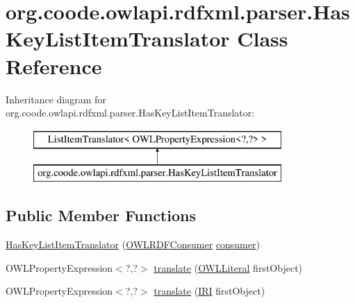\hypertarget{classorg_1_1coode_1_1owlapi_1_1rdfxml_1_1parser_1_1_has_key_list_item_translator}{\section{org.\-coode.\-owlapi.\-rdfxml.\-parser.\-Has\-Key\-List\-Item\-Translator Class Reference}
\label{classorg_1_1coode_1_1owlapi_1_1rdfxml_1_1parser_1_1_has_key_list_item_translator}
}
Inheritance diagram for org.\-coode.\-owlapi.\-rdfxml.\-parser.\-Has\-Key\-List\-Item\-Translator\-:\begin{figure}[H]
\begin{center}
\leavevmode
\includegraphics[height=2.000000cm]{classorg_1_1coode_1_1owlapi_1_1rdfxml_1_1parser_1_1_has_key_list_item_translator}
\end{center}
\end{figure}
\subsection*{Public Member Functions}
\begin{DoxyCompactItemize}
\item 
\hyperlink{classorg_1_1coode_1_1owlapi_1_1rdfxml_1_1parser_1_1_has_key_list_item_translator_aace56b655692b60ba6525d32198ca7e3}{Has\-Key\-List\-Item\-Translator} (\hyperlink{classorg_1_1coode_1_1owlapi_1_1rdfxml_1_1parser_1_1_o_w_l_r_d_f_consumer}{O\-W\-L\-R\-D\-F\-Consumer} \hyperlink{classorg_1_1coode_1_1owlapi_1_1rdfxml_1_1parser_1_1_has_key_list_item_translator_aef918fa2971c15b458d9f4413933c9b1}{consumer})
\item 
O\-W\-L\-Property\-Expression$<$?,?$>$ \hyperlink{classorg_1_1coode_1_1owlapi_1_1rdfxml_1_1parser_1_1_has_key_list_item_translator_a07486e527149742529fe0d2f65d0ce58}{translate} (\hyperlink{interfaceorg_1_1semanticweb_1_1owlapi_1_1model_1_1_o_w_l_literal}{O\-W\-L\-Literal} first\-Object)
\item 
O\-W\-L\-Property\-Expression$<$?,?$>$ \hyperlink{classorg_1_1coode_1_1owlapi_1_1rdfxml_1_1parser_1_1_has_key_list_item_translator_a2e801b6ae8ea0140ae359df02cdd968d}{translate} (\hyperlink{classorg_1_1semanticweb_1_1owlapi_1_1model_1_1_i_r_i}{I\-R\-I} first\-Object)
\end{DoxyCompactItemize}
